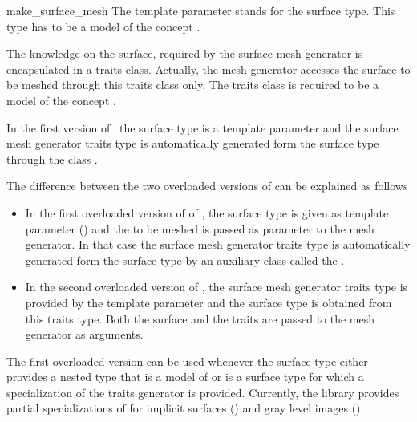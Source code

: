 \begin{ccRefFunction}{make_surface_mesh}
The template parameter   stands for the surface type.
This type has to be a model of the concept .

The knowledge on the surface, required by the surface mesh generator
is  encapsulated in a
traits class. Actually, the mesh generator accesses the surface to be meshed
through this traits class only. 
The traits class is required to be a model
of the concept .

In the first  version
of  \ccRefName\, the surface type is a template parameter 
and the surface mesh generator traits type 
is  automatically generated form the surface type  through
the class 
.

The difference between the two overloaded versions of
can be explained as follows
\begin{itemize}
\item
In the first  overloaded version of
of ,  the surface type  is given  
as template parameter  () and the 
to be meshed is passed as parameter to the mesh generator.
In that case the surface mesh generator traits type 
is  automatically generated form the surface type
by an auxiliary class called  the .
\item In the second overloaded version of , 
the surface mesh generator traits type is provided
by the  template parameter 
and the surface type is obtained from this traits type.
Both the surface and the traits 
are passed to the mesh generator as arguments. 
\end{itemize}


The first overloaded version can be used
whenever the surface type either provides  a nested type
that is  a model of 
or is a surface type for which a specialization
of the traits generator 
is provided.
Currently, the library provides partial specializations
of  
for implicit surfaces () and 
gray level images ().




\end{ccRefFunction}

